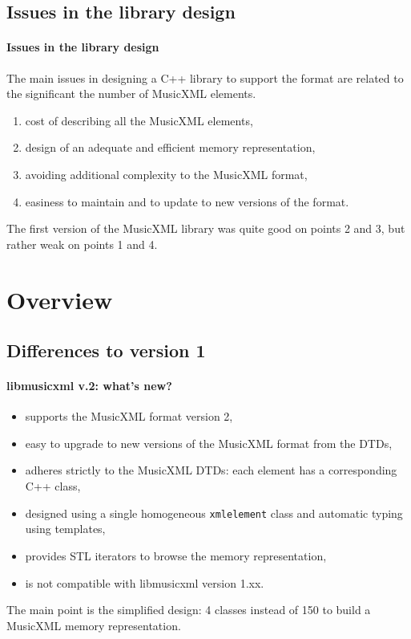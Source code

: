 \documentclass{beamer}
\begin{document}
\section{Issues in the library design}
\begin{frame}
	\frametitle{Issues in the library design}
	The main issues in designing a C++ library to support the format are related to the significant
	the number of MusicXML elements.
	\begin{enumerate}
		\item cost of describing all the MusicXML elements,
		\item design of an adequate and efficient memory representation,
		\item avoiding additional complexity to the MusicXML format,
		\item easiness to maintain and to update to new versions of the format.
	\end{enumerate}

	\begin{block}{}
	The first version of the MusicXML library was quite good on points 2 and 3, but rather weak
	on points 1 and 4.
	\end{block}
\end{frame}


\chapter{Overview}
\section{Differences to version 1}
\begin{frame}
	\frametitle{libmusicxml v.2: what's new?}

\begin{itemize}
		\item supports the MusicXML format version 2,
		\item easy to upgrade to new versions of the MusicXML format from the DTDs,
		\item adheres strictly to the MusicXML DTDs: each element has a corresponding C++ class,
		\item designed using a single homogeneous \texttt{xmlelement} class   and automatic
		typing using templates,
		\item provides STL iterators to browse the memory representation,
		\item is \alert{not compatible} with libmusicxml version 1.xx.
	\end{itemize}
	\begin{block}{}
	The main point is the simplified design: 4 classes instead of 150 to build a MusicXML
	memory representation.
	\end{block}
\end{frame}
\end{document}
